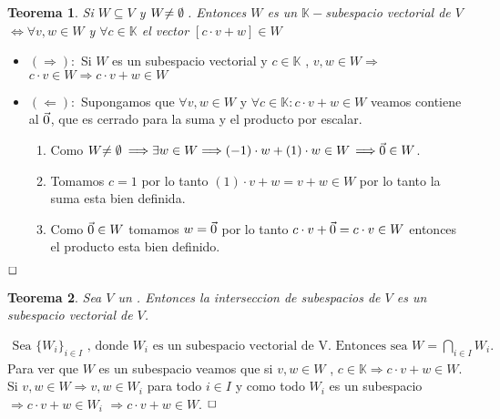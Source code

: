 \documentclass[]{article}
\newtheorem{theorem}{Teorema}
\newenvironment{proof}{\noindent{\bf Prueba:}}{$\hfill \Box$ \vspace{10pt}}
\newcommand{\K}{
    \mathbb{K}
}
\newcommand{\ida}{\Longrightarrow}
\begin{document}
\newpage

\begin{theorem}
    Si $W \subseteq V$ y $W\text{$\neq\emptyset$}\:$. Entonces $W$ es un $\mathbb{K}-$subespacio vectorial de $V$ $\iff \forall v,w \in W$
    y $\forall c \in \mathbb{K}$ el vector $[c \cdot v + w] \in W$ 
\end{theorem}
\begin{proof}
    \begin{itemize}
        \item $(\Longrightarrow):$ Si $W$ es un subespacio vectorial y $c \in \mathbb{K}$ , $v,w \in W \Longrightarrow$
        $c \cdot v \in W \Longrightarrow c \cdot v + w \in W$
        \item $(\Longleftarrow):$ Supongamos que $\forall v,w \in W$ y  $\forall c \in \mathbb{K} : c \cdot v + w \in W$ veamos contiene
        al $\text{$\vec{0}$}$, que es cerrado para la suma y el producto por escalar.
        \begin{enumerate}
            
            \item Como $W \text{$\neq\emptyset$}\: \Longrightarrow \exists w \in W \Longrightarrow (-1) \cdot w + (1) \cdot w \in W$
            $\Longrightarrow \text{$\vec{0}$} \in W$.
            \item Tomamos $c=1$ por lo tanto $(1) \cdot v + w = v + w \in W$ por lo tanto la suma esta bien definida.
            \item Como $\text{$\vec{0}$} \in W$ tomamos $w=\text{$\vec{0}$}$ por lo tanto $c \cdot v + \text{$\vec{0}$} = c \cdot v \in W$
            entonces el producto esta bien definido.
        \end{enumerate}
    \end{itemize}
\end{proof}

\begin{theorem}
    Sea $V$ un \espvec. Entonces la interseccion de subespacios de $V$ es un subespacio vectorial de $V$.
\end{theorem}
\begin{proof}
    \begin{align*}
        \text{Sea $\{ W_i \}_{i \in I}$ , donde $W_i$ es un subespacio vectorial de V. Entonces sea } W = \bigcap_{i \in I}W_i.
    \end{align*}
    Para ver que $W$ es un subespacio veamos que si $v,w \in W$ , $c \in \K \ida c \cdot v + w \in W$.\\
    Si $v,w \in W \ida v,w \in W_i$ para todo $i \in I$ y como todo $W_i$ es un subespacio $\ida c \cdot v + w \in W_i$
    $\ida c \cdot v + w \in W$.
\end{proof}
\end{document}
